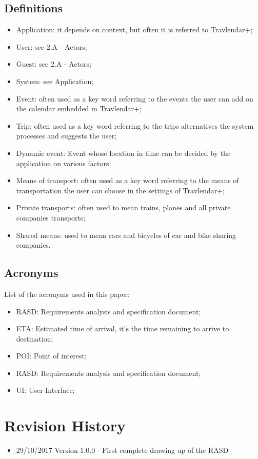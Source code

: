 \subsection{Definitions}
\begin{itemize}
\item Application: it depends on context, but often it is referred to Travlendar+;
\item User: see 2.A - Actors;
\item Guest: see 2.A - Actors;
\item System: see Application;
\item Event: often used as a key word referring to the events the user can add on the calendar embedded in Travlendar+;
\item Trip: often used as a key word referring to the trips alternatives the system processes and suggests the user;
\item Dynamic event: Event whose location in time can be decided by the application on various factors;
\item Means of transport: often used as a key word referring to the means of transportation the user can choose in the settings of Travlendar+;
\item Private transports: often used to mean trains, planes and all private companies transports;
\item Shared means: used to mean cars and bicycles of car and bike sharing companies.
\end{itemize}
%
\subsection{Acronyms}
List of the acronyms used in this paper:
\begin{itemize}
\item RASD: Requirements analysis and specification document;
\item ETA: Estimated time of arrival, it's the time remaining to arrive to destination;
\item POI: Point of interest;
\item RASD: Requirements analysis and specification document;
\item UI: User Interface;
\end{itemize}
%
%
\section{Revision History}
\begin{itemize}
\item 29/10/2017 Version 1.0.0 - First complete drawing up of the RASD
\end{itemize}
%
%
